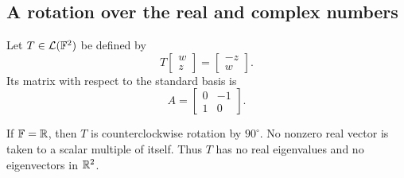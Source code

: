 \subsection{A rotation over the real and complex numbers}

\begin{example}\label{ex:rotation-eigenvalues}
  Let $T\in\mathcal L(\mathbb{F}^2)$ be defined by
  \[
    T\begin{bmatrix}w\\z\end{bmatrix}
      =\begin{bmatrix}-z\\w\end{bmatrix}.
  \]
  Its matrix with respect to the standard basis is
  \[
    A=\begin{bmatrix}0&-1\\1&0\end{bmatrix}.
  \]

  If $\mathbb{F}=\mathbb{R}$, then $T$ is counterclockwise rotation by
  $90^\circ$. No nonzero real vector is taken to a scalar
  multiple of itself. Thus $T$ has no real eigenvalues and no
  eigenvectors in $\mathbb{R}^2$.


\end{example}
